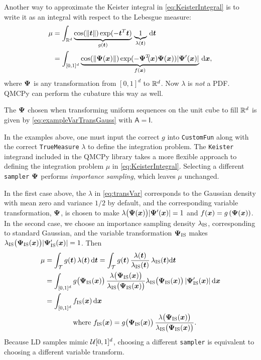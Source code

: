 \documentclass[graybox,footinfo]{svmult}
\newcommand{\QMCPYabs}[1]{\ensuremath{{\left \lvert #1 \right \rvert}}}
\newcommand{\IMP}{\textup{IS}}
\newcommand{\mA}{\mathsf{A}}
\newcommand{\mI}{\mathsf{I}}
\newcommand{\cube}{[0,1]^d}
\begin{document}
Another way to approximate the Keister integral in \eqref{eq:KeisterIntegral} is to write it as an integral with respect to the Lebesgue measure:
\begin{align*} 
	\mu 
	& = \int_{\bbR^d} \underbrace{\cos(\lVert \bst \rVert) \exp(-\bst^T \bst) }_{g(\bst)} \, \underbrace{1}_{\lambda(\bst)} \,\D \bst \\
	& = \int_{[0,1]^d} \underbrace{\cos(\lVert \bsPsi(\bsx) \rVert) \exp(-\bsPsi^T\!\!(\bsx) \bsPsi(\bsx)) \QMCPYabs{\bsPsi'(\bsx)}  }_{f(\bsx)} \, \D \bsx,
\end{align*}
where ${\boldsymbol{\Psi}}$ is any transformation from $[0,1]^d$ to ${\mathbb{R}}^d$. Now $\lambda$ is \emph{not} a PDF.  QMCPy can perform the cubature this way as well.

The ${\boldsymbol{\Psi}}$ chosen when transforming uniform sequences on the unit cube to fill ${\mathbb{R}}^d$ is  given by \eqref{eq:exampleVarTransGauss} with $\mA = \mI$.

In the examples above, one must input the correct $g$ into \texttt{CustomFun} along with the correct \texttt{TrueMeasure} $\lambda$ to define the integration problem. The \texttt{Keister} integrand included in the QMCPy library takes a more flexible approach to defining the integration problem $\mu$ in \eqref{eq:KeisterIntegral}. Selecting a different \texttt{sampler} ${\boldsymbol{\Psi}}$ performs  \emph{importance sampling}, which leaves $\mu$ unchanged.  


In the first case above, the $\lambda$ in \eqref{eq:transVar} corresponds to the Gaussian density  with mean zero and variance $1/2$ by default, and the corresponding variable transformation, ${\boldsymbol{\Psi}}$, is chosen to make $\lambda\bigl(\bsPsi(\bsx)\bigr) \QMCPYabs{\bsPsi'(\bsx)}  = 1$ and $f({\boldsymbol{x}}) = g\left({\boldsymbol{\Psi}}({\boldsymbol{x}}) \right)$.  In the second case,  we choose an importance sampling density $\lambda_{\IMP}$, corresponding  to standard  Gaussian, and the variable transformation $\bsPsi_{\IMP}$ makes $\lambda_\IMP\bigl(\bsPsi_{\IMP}(\bsx)\bigr) \QMCPYabs{\bsPsi'_{\IMP}(\bsx)}  = 1$.  Then
\begin{align}
	\nonumber 
	\mu &= \int_\calT g(\bst) \, \lambda(\bst) \, \D \bst  = \int_\calT g(\bst) \, \frac{\lambda(\bst)}{\lambda_\IMP(\bst) } \, \lambda_\IMP(\bst) \D \bst  \\ 
	\nonumber
	& =  \int_{\cube} g\bigl(\bsPsi_\IMP(\bsx)\bigr) \, \frac{\lambda\bigl(\bsPsi_\IMP(\bsx)\bigr)} {\lambda_\IMP\bigl(\bsPsi_\IMP(\bsx)\bigr) } \lambda_\IMP\bigl(\bsPsi_\IMP(\bsx)\bigr) \,\QMCPYabs{\bsPsi'_{\IMP}(\bsx)}  \, \D \bsx \\
	\nonumber
	& =  \int_{\cube} f_\IMP(\bsx) \, \D \bsx  \\
	\label{eq:transVarImp}
	& \qquad \qquad \text{where } f_\IMP(\bsx)  = g\bigl(\bsPsi_\IMP(\bsx)\bigr)  \,  \frac{\lambda\bigl(\bsPsi_\IMP(\bsx)\bigr)} {\lambda_\IMP\bigl(\bsPsi_\IMP(\bsx)\bigr) }.
\end{align}
Because LD samples mimic $\calU\cube$, choosing a different \texttt{sampler} is equivalent to choosing a different variable transform.
\end{document}
